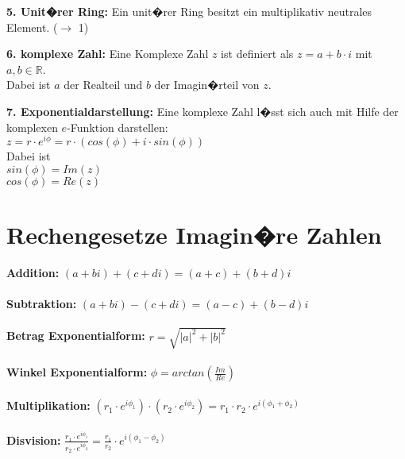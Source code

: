 \textbf{5. Unit�rer Ring:} Ein unit�rer Ring besitzt ein multiplikativ neutrales Element. ($\rightarrow$ 1)

\textbf{6. komplexe Zahl:} Eine Komplexe Zahl $z$ ist definiert als $z = a + b\cdot i$ mit $a,b \in \mathbb{R}$.\\
Dabei ist $a$ der Realteil und $b$ der Imagin�rteil von $z$.

\textbf{7. Exponentialdarstellung:} Eine komplexe Zahl l�sst sich auch mit Hilfe der komplexen $e$-Funktion darstellen:\\
$z = r \cdot e^{i\phi} = r \cdot (cos(\phi) + i \cdot sin(\phi))$\\
Dabei ist \\
$sin(\phi) = Im(z)$\\
$cos(\phi) = Re(z)$

\section*{Rechengesetze Imagin�re Zahlen}
\textbf{Addition:} $(a + bi) + (c + di) = (a + c) + (b + d)i$\\\\
\textbf{Subtraktion:} $(a + bi) - (c + di) = (a - c) + (b - d)i$\\\\
\textbf{Betrag Exponentialform:} $r = \sqrt{|a|^2 + |b|^2}$\\\\
\textbf{Winkel Exponentialform:} $\phi = arctan(\frac{Im}{Re})$\\\\
\textbf{Multiplikation:} $(r_1 \cdot e^{i\phi_1}) \cdot (r_2 \cdot e^{i\phi_2}) = r_1 \cdot r_2 \cdot e^{i(\phi_1+\phi_2)}$\\\\
\textbf{Disvision:} $\frac{r_1 \cdot e^{i\phi_1}}{r_2 \cdot e^{i\phi_2}} = \frac{r_1}{r_2} \cdot e^{i(\phi_1-\phi_2)}$
